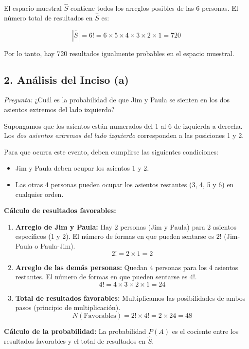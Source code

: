 \documentclass[a4paper]{article}
\begin{document}
El espacio muestral $\hat{S}$ contiene todos los arreglos posibles de las 6 personas. El número total de resultados en $\hat{S}$ es:

$$ |\hat{S}| = 6! = 6 \times 5 \times 4 \times 3 \times 2 \times 1 = 720 $$

Por lo tanto, hay 720 resultados igualmente probables en el espacio muestral.

\subsection*{2. Análisis del Inciso (a)}

\textit{Pregunta:} ¿Cuál es la probabilidad de que Jim y Paula se sienten en los dos asientos extremos del lado izquierdo?

Supongamos que los asientos están numerados del 1 al 6 de izquierda a derecha. Los \textit{dos asientos extremos del lado izquierdo} corresponden a las posiciones 1 y 2.

Para que ocurra este evento, deben cumplirse las siguientes condiciones:
\begin{itemize}
    \item Jim y Paula deben ocupar los asientos 1 y 2.
    \item Las otras 4 personas pueden ocupar los asientos restantes (3, 4, 5 y 6) en cualquier orden.
\end{itemize}

\textbf{Cálculo de resultados favorables:}
\begin{enumerate}
    \item \textbf{Arreglo de Jim y Paula:} Hay 2 personas (Jim y Paula) para 2 asientos específicos (1 y 2). El número de formas en que pueden sentarse es $2!$ (Jim-Paula o Paula-Jim).
    $$ 2! = 2 \times 1 = 2 $$
    \item \textbf{Arreglo de las demás personas:} Quedan 4 personas para los 4 asientos restantes. El número de formas en que pueden sentarse es $4!$.
    $$ 4! = 4 \times 3 \times 2 \times 1 = 24 $$
    \item \textbf{Total de resultados favorables:} Multiplicamos las posibilidades de ambos pasos (principio de multiplicación).
    $$ N(\text{Favorables}) = 2! \times 4! = 2 \times 24 = 48 $$
\end{enumerate}

\textbf{Cálculo de la probabilidad:}
La probabilidad $P(A)$ es el cociente entre los resultados favorables y el total de resultados en $\hat{S}$.
\end{document}
